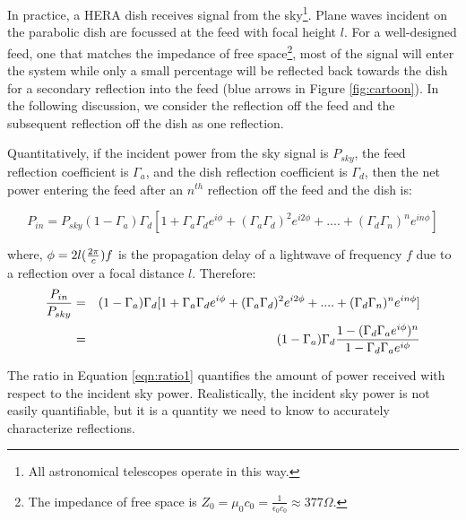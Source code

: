 \documentclass[12pt,preprint]{aastex}
\begin{document}
In practice, a HERA dish receives signal from the sky\footnote{All astronomical
telescopes operate in this way.}. Plane waves incident on the parabolic dish
are focussed at the feed with focal height $l$. For a well-designed feed, one
that matches the impedance of free space\footnote{The impedance of free space
is $Z_{0} = \mu_{0}c_{0} = \frac{1}{\epsilon_{0}c_{0}} \approx 377\Omega $.},
most of the signal will enter the system while only
a small percentage will be reflected back towards the dish for a secondary
reflection into the feed (blue arrows in Figure \ref{fig:cartoon}). In the
following discussion, we consider the reflection off the feed and the
subsequent reflection off the dish as one reflection.

Quantitatively, if the incident power from the sky signal is $P_{sky}$, the feed
reflection coefficient is $\Gamma_{a}$, and the dish reflection
coefficient is $\Gamma_{d}$, then the net power entering the feed after an
$n^{th}$ reflection off the feed and the dish is:

\begin{equation}\label{eqn:series1}
P_{in} =  P_{sky}(1-\Gamma_{a})\Gamma_{d} [1+ \Gamma_{a}\Gamma_{d} e^{i\phi}+ (\Gamma_{a}\Gamma_{d})^2e^{i2\phi}+ ....+ (\Gamma_{d}\Gamma_{n})^{n}e^{in\phi}]
\end{equation}

where, $\phi = 2l({2\pi \over c})f$ is the propagation delay of a lightwave of frequency $f$ due to a reflection over a focal distance $l$. 
Therefore:
\begin{eqnarray}\label{eqn:ratio1}
{P_{in} \over P_{sky} } & = & (1-\Gamma_{a})\Gamma_{d} [1+ \Gamma_{a}\Gamma_{d} e^{i\phi}+ (\Gamma_{a}\Gamma_{d})^2e^{i2\phi}+ ....+ (\Gamma_{d}\Gamma_{n})^{n}e^{in\phi}] \nonumber\\
      & = & (1-\Gamma_{a})\Gamma_{d} {1-(\Gamma_{d}\Gamma_{a}e^{i\phi})^{n} \over 1-\Gamma_{d} \Gamma_{a} e^{i\phi} } 
\end{eqnarray}

The ratio in Equation \ref{eqn:ratio1} quantifies the amount of power received
with respect to the incident sky power. Realistically, the incident sky power
is not easily quantifiable, but it is a quantity we need to know to accurately
characterize reflections.  


 
\end{document}
